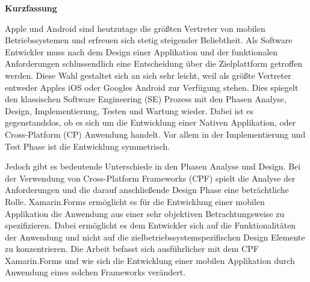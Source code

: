 %
%
% 
% 



\cleardoublepage

\begin{center}
{\Large\bfseries Kurzfassung}
\end{center}

Apple und Android sind heutzutage die größten Vertreter von mobilen Betriebssystemen und erfreuen sich stetig steigender Beliebtheit. Als Software Entwickler muss nach dem Design einer Applikation und der funktionalen Anforderungen schlussendlich eine Entscheidung über die Zielplattform getroffen werden. Diese Wahl gestaltet sich an sich sehr leicht, weil als größte Vertreter entweder Apples iOS oder Googles Android zur Verfügung stehen. Dies spiegelt den klassischen Software Engineering (SE) Prozess mit den Phasen Analyse, Design, Implementierung, Testen und Wartung wieder. Dabei ist es gegenstandslos, ob es sich um die Entwicklung einer Nativen Applikation, oder Cross-Platform (CP) Anwendung handelt. Vor allem in der Implementierung und Test Phase ist die Entwicklung symmetrisch.

Jedoch gibt es bedeutende Unterschiede in den Phasen Analyse und Design. Bei der Verwendung von Cross-Platform Frameworks (CPF) spielt die Analyse der Anforderungen und die darauf anschließende Design Phase eine beträchtliche Rolle. Xamarin.Forms ermöglicht es für die Entwicklung einer mobilen Applikation die Anwendung aus einer sehr objektiven Betrachtungsweise zu spezifizieren. Dabei ermöglicht es dem Entwickler sich auf die Funktionalitäten der Anwendung und nicht auf die zielbetriebssystemspezifischen Design Elemente zu konzentrieren. Die Arbeit befasst sich ausführlicher mit dem CPF Xamarin.Forms und wie sich die Entwicklung einer mobilen Applikation durch Anwendung eines solchen Frameworks verändert.


\cleardoublepage

